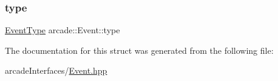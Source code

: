 \subsubsection{\texorpdfstring{type}{type}}
{\footnotesize\ttfamily \hyperlink{namespacearcade_a608583b2070905ecc26e957409bb4f93}{Event\+Type} arcade\+::\+Event\+::type}



The documentation for this struct was generated from the following file\+:\begin{DoxyCompactItemize}
\item 
arcade\+Interfaces/\hyperlink{_event_8hpp}{Event.\+hpp}\end{DoxyCompactItemize}

